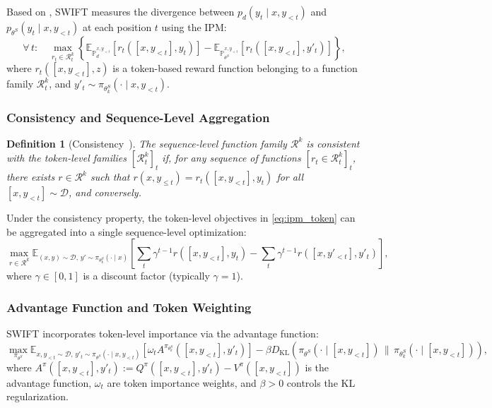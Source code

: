 \documentclass[11pt,a4paper]{article}
\newtheorem{definition}[theorem]{Definition}
\newcommand{\Pd}{\mathbb{P}_d}
\newcommand{\Ps}{\mathbb{P}_{\theta^S}}
\newcommand{\E}{\mathbb{E}}
\newcommand{\DKL}{D_{\mathrm{KL}}}
\begin{document}
Based on , SWIFT measures the divergence between $p_d(y_t \mid x, y_{<t})$ and $p_{\theta^S}(y_t \mid x, y_{<t})$ at each position $t$ using the IPM:
\begin{equation}
    \forall\, t: \quad \max_{r_t \in \mathcal{R}_t^k} \left\{ \E_{\Pd^{x,y_{<t}}} \left[ r_t([x, y_{<t}], y_t) \right] - \E_{\Ps^{x,y_{<t}}} \left[ r_t([x, y_{<t}], y'_t) \right] \right\},
    \label{eq:ipm_token}
\end{equation}
where $r_t([x, y_{<t}], z)$ is a token-based reward function belonging to a function family $\mathcal{R}_t^k$, and $y'_t \sim \pi_{\theta^S_k}(\cdot \mid x, y_{<t})$.

\subsubsection{Consistency and Sequence-Level Aggregation}

\begin{definition}[Consistency~\cite{le2025swift}]
\label{def:consistency}
The sequence-level function family $\mathcal{R}^k$ is \emph{consistent} with the token-level families $[\mathcal{R}_t^k]_t$ if, for any sequence of functions $[r_t \in \mathcal{R}_t^k]_t$, there exists $r \in \mathcal{R}^k$ such that $r(x, y_{\leq t}) = r_t([x, y_{<t}], y_t)$ for all $[x, y_{<t}] \sim \mathcal{D}$, and conversely.
\end{definition}

Under the consistency property, the token-level objectives in \eqref{eq:ipm_token} can be aggregated into a single sequence-level optimization:
\begin{equation}
    \max_{r \in \mathcal{R}^k} \E_{(x,y) \sim \mathcal{D},\, y' \sim \pi_{\theta^S_k}(\cdot \mid x)} \left[ \sum_t \gamma^{t-1} r([x, y_{<t}], y_t) - \sum_t \gamma^{t-1} r([x, y'_{<t}], y'_t) \right],
    \label{eq:swift_seq}
\end{equation}
where $\gamma \in [0,1]$ is a discount factor (typically $\gamma = 1$).

\subsubsection{Advantage Function and Token Weighting}

SWIFT incorporates token-level importance via the advantage function:
\begin{equation}
    \max_{\pi_{\theta^S}} \E_{x, y_{<t} \sim \mathcal{D},\, y'_t \sim \pi_{\theta^S}(\cdot \mid x, y_{<t})} \left[ \omega_t A^{\pi_{\theta^S_k}}([x, y_{<t}], y'_t) \right] - \beta \DKL\!\left(\pi_{\theta^S}(\cdot \mid [x, y_{<t}]) \,\|\, \pi_{\theta^S_k}(\cdot \mid [x, y_{<t}])\right),
    \label{eq:advantage}
\end{equation}
where $A^\pi([x, y_{<t}], y'_t) := Q^\pi([x, y_{<t}], y'_t) - V^\pi([x, y_{<t}])$ is the advantage function, $\omega_t$ are token importance weights, and $\beta > 0$ controls the KL regularization.
\end{document}
